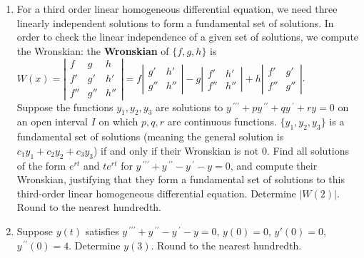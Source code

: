 \documentclass{ximera}
\begin{document}
\begin{enumerate}[label=(\arabic*)]




\item For a third order linear homogeneous differential equation, we need three linearly independent solutions to form a fundamental set of solutions. In order to check the linear independence of a given set of solutions, we compute the Wronskian:  the \textbf{Wronskian} of $\{f,g,h\}$ is\\ $\displaystyle
W(x)=\left|\begin{array}{ccc} f & g & h\\ f' & g'  & h'\\ f'' & g'' & h''\end{array}\right| = f\left|\begin{array}{cc} g' & h'\\ g'' & h'' \end{array}\right|-g\left|\begin{array}{cc} f' & h'\\ f'' & h'' \end{array}\right| + h\left|\begin{array}{cc} f' & g'\\ f'' & g'' \end{array}\right|$.\\ Suppose the functions $y_1,y_2,y_3$ are solutions to $y\,^{\prime\prime\prime}+py\,^{\prime\prime}+qy\,^{\prime}+ry=0$ on an open interval $I$ on which $p,q,r$ are continuous functions.  $\{y_1,y_2,y_3\}$ is a fundamental set of solutions (meaning the general solution is\\ $c_1 y_1+c_2 y_2+c_3 y_3$) if and only if their Wronskian is not $0$.  Find all solutions of the form $e^{rt}$ and $te^{rt}$ for $y\,^{\prime\prime\prime}+y\,^{\prime\prime}-y\,^{\prime}-y=0$, and compute their Wronskian, justifying that they form a fundamental set of solutions to this third-order linear homogeneous differential equation.  Determine $|W(2)|$.  Round to the nearest hundredth.





\item Suppose $y(t)$ satisfies $y\,^{\prime\prime\prime}+y\,^{\prime\prime}-y\,^{\prime}-y=0$, $y(0)=0$, $y'(0)=0$, $y^{\,\prime\prime}(0)=4$.  Determine $y(3)$.  Round to the nearest hundredth.  











\end{enumerate}
\end{document}
